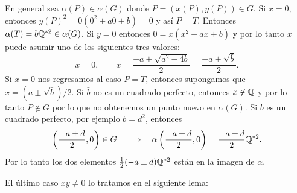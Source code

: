 \documentclass[../../tesis_maestria]{subfiles}
\begin{document}
En general sea $\alpha(P)\in\alpha(G)$ donde $P=(x(P),y(P))\in G$. Si $x=0$, entonces $y(P)^2=0(0^2+a0+b)=0$ y así $P=T$. Entonces $\alpha(T)=b\mathbb{Q}^{*2}\in\alpha(G)$. Si $y=0$ entonces $0=x(x^2+ax+b)$ y por lo tanto $x$ puede asumir uno de los siguientes tres valores:
\[
	x=0,\qquad x=\frac{-a\pm\sqrt{a^2-4b}}{2}=\frac{-a\pm\sqrt{\bar{b}}}{2}.
\]
Si $x=0$ nos regresamos al caso $P=T$, entonces supongamos que $x=(a\pm\sqrt{\bar{b}})/2$. Si $\bar{b}$ no es un cuadrado perfecto, entonces $x\not\in\mathbb{Q}$ y por lo tanto $P\not\in G$ por lo que no obtenemos un punto nuevo en $\alpha(G)$. Si $\bar{b}$ es un cuadrado perfecto, por ejemplo $\bar{b}=d^2$, entonces
\[
	\left( \frac{-a\pm d}{2},0 \right)\in G\quad\Longrightarrow\quad \alpha\left( \frac{-a\pm d}{2},0 \right)=\frac{-a\pm d}{2}\mathbb{Q}^{*2}.
\]
Por lo tanto los dos elementos $\tfrac{1}{2}(-a\pm d)\mathbb{Q}^{*2}$ están en la imagen de $\alpha$.

El último caso $xy\neq0$ lo tratamos en el siguiente lema:
\end{document}
